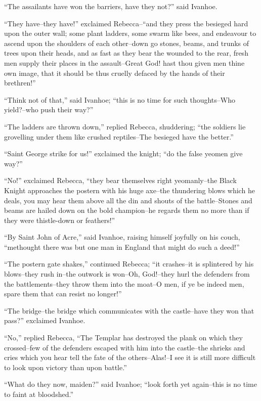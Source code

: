 ``The assailants have won the barriers, have they not?'' said Ivanhoe.

``They have--they have!'' exclaimed Rebecca--``and they press the
besieged hard upon the outer wall; some plant ladders, some swarm like
bees, and endeavour to ascend upon the shoulders of each other--down go
stones, beams, and trunks of trees upon their heads, and as fast as they
bear the wounded to the rear, fresh men supply their places in the
assault--Great God! hast thou given men thine own image, that it should
be thus cruelly defaced by the hands of their brethren!''

``Think not of that,'' said Ivanhoe; ``this is no time for such
thoughts--Who yield?--who push their way?''

``The ladders are thrown down,'' replied Rebecca, shuddering; ``the
soldiers lie grovelling under them like crushed reptiles--The besieged
have the better.''

``Saint George strike for us!'' exclaimed the knight; ``do the false
yeomen give way?''

``No!'' exclaimed Rebecca, ``they bear themselves right yeomanly--the
Black Knight approaches the postern with his huge axe--the thundering
blows which he deals, you may hear them above all the din and shouts of
the battle--Stones and beams are hailed down on the bold champion--he
regards them no more than if they were thistle-down or feathers!''

``By Saint John of Acre,'' said Ivanhoe, raising himself joyfully on his
couch, ``methought there was but one man in England that might do such a
deed!''

``The postern gate shakes,'' continued Rebecca; ``it crashes--it is
splintered by his blows--they rush in--the outwork is won--Oh,
God!--they hurl the defenders from the battlements--they throw them into
the moat--O men, if ye be indeed men, spare them that can resist no
longer!''

``The bridge--the bridge which communicates with the castle--have they
won that pass?'' exclaimed Ivanhoe.

``No,'' replied Rebecca, ``The Templar has destroyed the plank on which
they crossed--few of the defenders escaped with him into the castle--the
shrieks and cries which you hear tell the fate of the others--Alas!--I
see it is still more difficult to look upon victory than upon battle.''

``What do they now, maiden?'' said Ivanhoe; ``look forth yet again--this
is no time to faint at bloodshed.''

